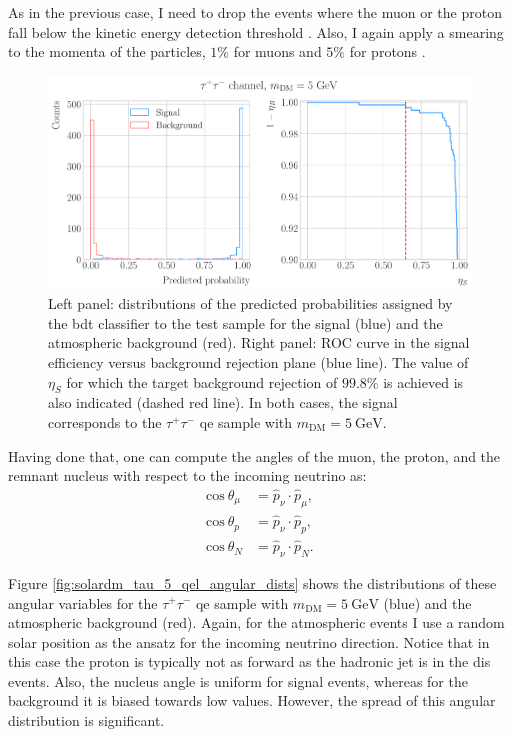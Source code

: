 As in the previous case, I need to drop the events where the muon or the proton fall below the kinetic energy detection threshold \cite{DUNE2020TDR2}. Also, I again apply a smearing to the momenta of the particles, $1\%$ for muons and $5\%$ for protons \cite{DUNE2020TDR2}.

\begin{figure}[t]
	\centering
	\includegraphics[width=0.95\linewidth]{Images/DM_Analysis/solardm_tau_5_qel_bdt_classifier.pdf}
	\caption[Performance of the \gls{bdt} classifier for the $\tau^{+}\tau^{-}$ \gls{qe} signal with $m_{\mathrm{DM}} = 5 \ \mathrm{GeV}$.]{Left panel: distributions of the predicted probabilities assigned by the \gls{bdt} classifier to the test sample for the signal (blue) and the atmospheric background (red). Right panel: ROC curve in the signal efficiency versus background rejection plane (blue line). The value of $\eta_{S}$ for which the target background rejection of $99.8\%$ is achieved is also indicated (dashed red line). In both cases, the signal corresponds to the $\tau^{+}\tau^{-}$ \gls{qe} sample with $m_{\mathrm{DM}} = 5 \ \mathrm{GeV}$.}
	\label{fig:solardm_tau_5_qel_classifier}
\end{figure}

Having done that, one can compute the angles of the muon, the proton, and the remnant nucleus with respect to the incoming neutrino as:
\begin{align}
	\mathrm{cos} \ \theta_{\mu} &= \hat{p}_{\nu} \cdot \hat{p}_{\mu},\label{6.8} \\
	\mathrm{cos} \ \theta_{p} &= \hat{p}_{\nu} \cdot \hat{p}_{p},\label{6.9} \\
	\mathrm{cos} \ \theta_{N} &= \hat{p}_{\nu} \cdot \hat{p}_{N}. \label{6.10}
\end{align}

Figure \ref{fig:solardm_tau_5_qel_angular_dists} shows the distributions of these angular variables for the $\tau^{+}\tau^{-}$ \gls{qe} sample with $m_{\mathrm{DM}} = 5 \ \mathrm{GeV}$ (blue) and the atmospheric background (red). Again, for the atmospheric events I use a random solar position as the ansatz for the incoming neutrino direction. Notice that in this case the proton is typically not as forward as the hadronic jet is in the \gls{dis} events. Also, the nucleus angle is uniform for signal events, whereas for the background it is biased towards low values. However, the spread of this angular distribution is significant.


